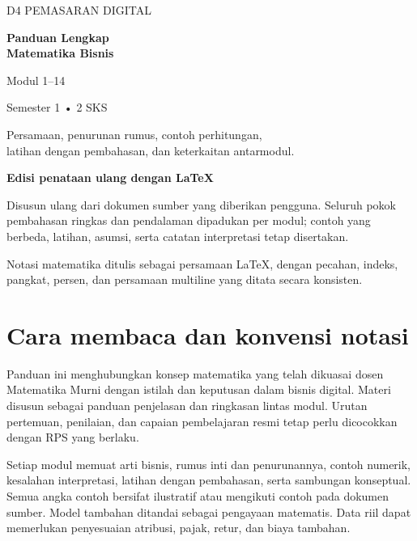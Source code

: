 \documentclass[11pt,a4paper]{article}
\begin{document}
\begin{titlepage}
\vspace*{25mm}
{\sffamily\color{teal}\large D4 PEMASARAN DIGITAL\par}
\vspace{12mm}
{\sffamily\bfseries\color{navy}\Huge Panduan Lengkap\\[5mm]Matematika Bisnis\par}
\vspace{8mm}
{\sffamily\LARGE Modul 1--14\par}
\vspace{8mm}
{\large Semester 1 • 2 SKS\par}
\vspace{18mm}
{\large Persamaan, penurunan rumus, contoh perhitungan,\\latihan dengan pembahasan, dan keterkaitan antarmodul.\par}
\vfill
\textbf{Edisi penataan ulang dengan LaTeX}\par
Disusun ulang dari dokumen sumber yang diberikan pengguna. Seluruh pokok pembahasan ringkas dan pendalaman dipadukan per modul; contoh yang berbeda, latihan, asumsi, serta catatan interpretasi tetap disertakan.
\par
Notasi matematika ditulis sebagai persamaan LaTeX, dengan pecahan, indeks, pangkat, persen, dan persamaan multiline yang ditata secara konsisten.
\end{titlepage}
\tableofcontents
\clearpage
\section{Cara membaca dan konvensi notasi}
Panduan ini menghubungkan konsep matematika yang telah dikuasai dosen Matematika Murni dengan istilah dan keputusan dalam bisnis digital. Materi disusun sebagai panduan penjelasan dan ringkasan lintas modul. Urutan pertemuan, penilaian, dan capaian pembelajaran resmi tetap perlu dicocokkan dengan RPS yang berlaku.

Setiap modul memuat arti bisnis, rumus inti dan penurunannya, contoh numerik, kesalahan interpretasi, latihan dengan pembahasan, serta sambungan konseptual. Semua angka contoh bersifat ilustratif atau mengikuti contoh pada dokumen sumber. Model tambahan ditandai sebagai pengayaan matematis. Data riil dapat memerlukan penyesuaian atribusi, pajak, retur, dan biaya tambahan.
\end{document}
